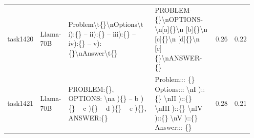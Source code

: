 \begin{longtable}{@{}p{0.8cm\tiny}p{1cm\tiny}p{4.1cm\ttfamily\tiny}p{4.1cm\ttfamily\tiny}p{0.8cm\tiny}p{0.8cm\tiny}@{}}
task1420  & Llama-70B  & Problem\textbackslash{}t\{\}\textbackslash{}nOptions\textbackslash{}t i):\{\} -- ii):\{\} -- iii):\{\} -- iv):\{\} -- v):\{\}\textbackslash{}nAnswer\textbackslash{}t\{\}                                                                                                                                                                                                                                                                                                                                               & PROBLEM- \{\}\textbackslash{}nOPTIONS-  \textbackslash{}n{[}a{]}\{\}\textbackslash{}n {[}b{]}\{\}\textbackslash{}n {[}c{]}\{\}\textbackslash{}n {[}d{]}\{\}\textbackslash{}n {[}e{]}\{\}\textbackslash{}nANSWER- \{\}                                                                                                                                                                                                                                                                                                                                                             & 0.26 & 0.22 \\
task1421  & Llama-70B  & PROBLEM:\{\}, OPTIONS: \textbackslash{}na )\{\} -- b )\{\} -- c )\{\} -- d )\{\} -- e )\{\}, ANSWER:\{\}                                                                                                                                                                                                                                                                                                                                                                                                                & Problem::: \{\} Options:::  \textbackslash{}nI )::\{\} \textbackslash{}nII )::\{\} \textbackslash{}nIII )::\{\} \textbackslash{}nIV )::\{\} \textbackslash{}nV )::\{\} Answer::: \{\}                                                                                                                                                                                                                                                                                                                                                                                             & 0.28 & 0.21 \\

\end{longtable}
